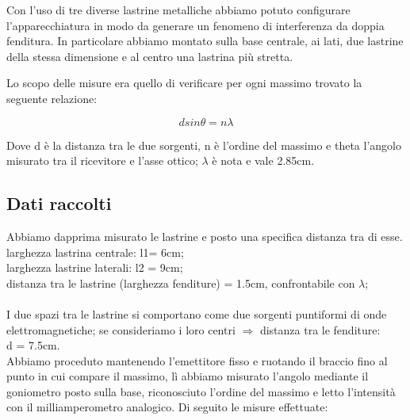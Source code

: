 \documentclass{article}
\theoremstyle{definition}
\begin{document}
Con l'uso di tre diverse lastrine metalliche abbiamo potuto configurare l'apparecchiatura in modo da generare un fenomeno di interferenza da doppia fenditura. In particolare abbiamo montato sulla base centrale, ai lati, due lastrine della stessa dimensione e al centro una lastrina più stretta. 

\noindent Lo scopo delle misure era quello di verificare per ogni massimo trovato la seguente relazione:

\[d sin\theta = n \lambda\]

Dove d è la distanza tra le due sorgenti, n è l'ordine del massimo e theta l'angolo misurato tra il ricevitore e l'asse ottico; \(\lambda\) è nota e vale 2.85cm.

\begin{figure}[!ht]
    	\captionsetup{labelformat=empty}

\end{figure}




\subsection{Dati raccolti}

Abbiamo dapprima misurato le lastrine e posto una specifica distanza tra di esse.\\
\noindent
larghezza lastrina centrale: l1= 6cm;\\
larghezza lastrine laterali: l2 = 9cm;\\
distanza tra le lastrine (larghezza fenditure) = 1.5cm, confrontabile con \(\lambda\);\\\\
\noindent I due spazi tra le lastrine si comportano come due sorgenti puntiformi di onde elettromagnetiche; se consideriamo i loro centri $\Rightarrow$ distanza tra le fenditure:\\ d = 7.5cm.\\

\noindent Abbiamo proceduto mantenendo l'emettitore fisso e ruotando il braccio fino al punto in cui compare il massimo, lì abbiamo misurato l'angolo mediante il goniometro posto sulla base, riconosciuto l'ordine del massimo e letto l'intensità con il milliamperometro analogico. Di seguito le misure effettuate:
\end{document}
